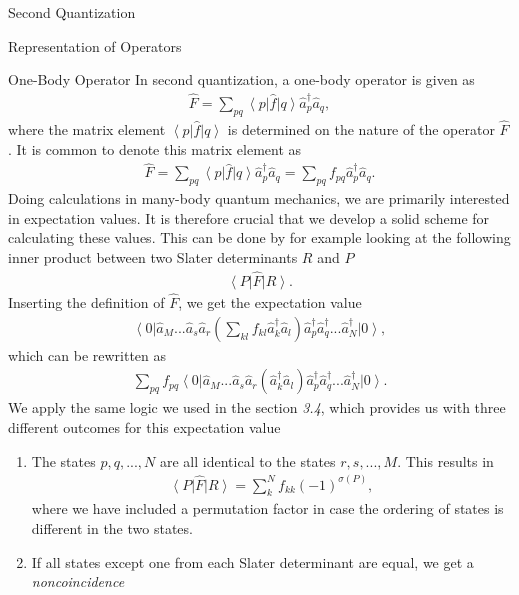 \documentclass[twoside,english]{uiofysmaster}
\begin{document}
\begin{chapter}{Second Quantization}
\begin{section}{Representation of Operators}
		\begin{subsection}{One-Body Operator}
			In second quantization, a one-body operator is given as
			\begin{align}
				\hat F = \sum_{pq} \left< p \right| \hat f \left| q \right> \hat a_p^\dagger \hat a_q,
			\end{align}
			where the matrix element $\left< p \right| \hat f \left| q \right>$ is determined on the nature of the operator $\hat F$. It is common to denote this matrix element as
			\begin{align}
				\hat F = \sum_{pq} \left< p \right| \hat f \left| q \right> \hat a_p^\dagger \hat a_q = \sum_{pq} f_{pq} \hat a_p^\dagger \hat a_q.
			\end{align}
			Doing calculations in many-body quantum mechanics, we are primarily interested in expectation values. It is therefore crucial that we develop a solid scheme for calculating these values. This can be done by for example looking at the following inner product  between two Slater determinants $R$ and $P$
			\begin{align}
				\left< P \right| \hat F \left| R \right> .
			\end{align}
			Inserting the definition of $\hat F$, we get the expectation value
			\begin{align}
				\left< 0 \right| \hat a_M ... \hat a_s \hat a_r \left( \sum_{kl} f_{kl} \hat a_k^\dagger \hat a_l \right) \hat a_p^\dagger \hat a_q^\dagger ... \hat a_N^\dagger \left| 0 \right>,
			\end{align}
			which can be rewritten as
			\begin{align}
				\sum_{pq} f_{pq} \left< 0 \right| \hat a_M ... \hat a_s \hat a_r (\hat a_k^\dagger \hat a_l) \hat a_p^\dagger \hat a_q^\dagger ... \hat a_N^\dagger \left| 0 \right>.
			\end{align}
			We apply the same logic we used in the section \textit{3.4}, which provides us with three different outcomes for this expectation value
			\begin{enumerate}
				\item The states $p,q,...,N$ are all identical to the states $r,s,...,M$. This results in
				\begin{align}
					\left< P \right| \hat F \left| R \right> = \sum_k^N f_{kk} (-1)^{\sigma(P)},
				\end{align}
				where we have included a permutation factor in case the ordering of states is different in the two states. 
				\item If all states except one from each Slater determinant are equal, we get a \textit{noncoincidence} \cite{ShavittAndBartlett}

\end{enumerate}
\end{subsection}
\end{section}
\end{chapter}
\end{document}
